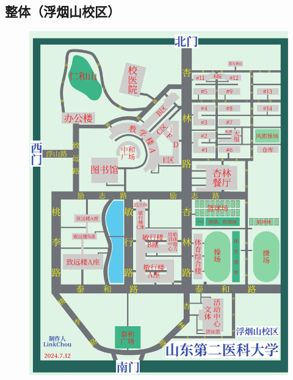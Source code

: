 \subsection[整体（浮烟山校区）]{整体（浮烟山校区）}
\begin{figure}[H]
    \centering
    \includegraphics*[height=0.9\textheight]{resources/map/浮烟山校区简图.pdf}
    \label{map_fuyanshan_holistic}
\end{figure}

\newpage
